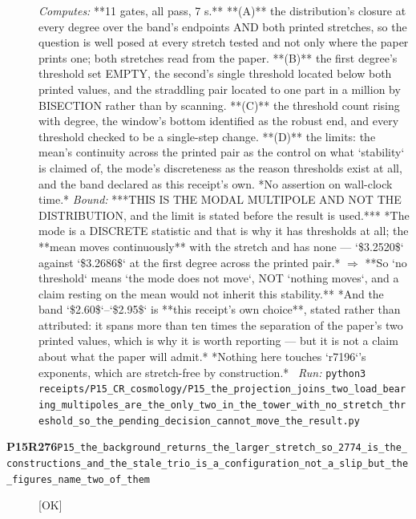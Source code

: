 \begin{description}
\emph{Computes:} **11 gates, all pass, 7 s.** **(A)** the distribution's closure at every degree over the band's endpoints AND both printed stretches, so the question is well posed at every stretch tested and not only where the paper prints one; both stretches read from the paper. **(B)** the first degree's threshold set EMPTY, the second's single threshold located below both printed values, and the straddling pair located to one part in a million by BISECTION rather than by scanning. **(C)** the threshold count rising with degree, the window's bottom identified as the robust end, and every threshold checked to be a single-step change. **(D)** the limits: the mean's continuity across the printed pair as the control on what `stability` is claimed of, the mode's discreteness as the reason thresholds exist at all, and the band declared as this receipt's own. *No assertion on wall-clock time.*
 \emph{Bound:}  ***THIS IS THE MODAL MULTIPOLE AND NOT THE DISTRIBUTION, and the limit is stated before the result is used.*** *The mode is a DISCRETE statistic and that is why it has thresholds at all; the **mean moves continuously** with the stretch and has none --- `\$3.2520\$` against `\$3.2686\$` at the first degree across the printed pair.* \ensuremath{\Rightarrow} **So `no threshold` means `the mode does not move`, NOT `nothing moves`, and a claim resting on the mean would not inherit this stability.**  *And the band `\$2.60\$`--`\$2.95\$` is **this receipt's own choice**, stated rather than attributed: it spans more than ten times the separation of the paper's two printed values, which is why it is worth reporting --- but it is not a claim about what the paper will admit.*  *Nothing here touches `r7196`'s exponents, which are stretch-free by construction.*
\ \emph{Run:} \texttt{python3 receipts/P15\_CR\_cosmology/P15\_the\_projection\_joins\_two\_load\_bearing\_multipoles\_are\_the\_only\_two\_in\_the\_tower\_with\_no\_stretch\_threshold\_so\_the\_pending\_decision\_cannot\_move\_the\_result.py}
\item[\rcptlabel{P15_the_background_returns_the_larger_stretch_so_2774_is_the_constructions_and_the_stale_trio_is_a_configuration_not_a_slip_but_the_figures_name_two_of_them}{P15R276}\textbf{P15R276}\quad\texttt{P15\_the\_background\_returns\_the\_larger\_stretch\_so\_2774\_is\_the\_constructions\_and\_the\_stale\_trio\_is\_a\_configuration\_not\_a\_slip\_but\_the\_figures\_name\_two\_of\_them}]\hfill\textsf{[OK]}\\

\end{description}

